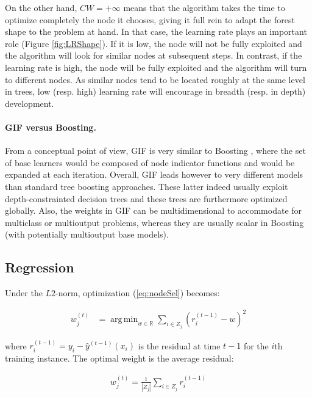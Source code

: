 \documentclass{article}
\DeclareMathOperator*{\argmin}{arg\,min}
\begin{document}
On the other hand, $CW=+\infty$ means that the algorithm takes the
time to optimize completely the node it chooses, giving it full rein
to adapt the forest shape to the problem at hand. In that case, the
learning rate plays an important role (Figure \ref{fig:LRShape}). If
it is low, the node will not be fully exploited and the algorithm will
look for similar nodes at subsequent steps.  In contrast, if the
learning rate is high, the node will be fully exploited and the
algorithm will turn to different nodes.  As similar nodes tend to be
located roughly at the same level in trees, low (resp. high) learning
rate will encourage in breadth (resp. in depth) development.


\paragraph{GIF versus Boosting.}
From a conceptual point of view, GIF is very similar to Boosting
\cite{hastie2009}, where the set of base learners would be composed of node
indicator functions and would be expanded at each iteration. Overall, GIF leads
however to very different models than standard tree boosting approaches. These
latter indeed usually exploit depth-constrainted decision trees and these trees
are furthermore optimized globally. Also, the weights in GIF can be
multidimensional to accommodate for multiclass or multioutput problems, whereas
they are usually scalar in Boosting (with potentially multioutput base
models).


\subsection{Regression}
\label{subsec:regression}

Under the $L2$-norm, optimization (\ref{eq:nodeSel}) becomes:

\vspace*{-\baselineskip}
\begin{align}\label{eq:L2min}
w_j^{(t)} &=  \argmin_{w \in \mathbb{R}} \sum_{i \in Z_j} \left(r_i^{(t-1)} - 
w\right)^2
\end{align}
\vspace*{-\baselineskip}

where $r_i^{(t-1)} = y_i - \hat{y}^{(t-1)}(x_i)$ is the residual at time $t-1$ 
for the $i$th training instance.
The optimal weight is the average residual:

\vspace*{-\baselineskip}
\begin{align}\label{eq:L2Solution}
w_j^{(t)} = \frac{1}{|Z_j|} \sum_{i \in Z_j} r_i^{(t-1)}
\end{align}
\vspace*{-\baselineskip}
\end{document}
